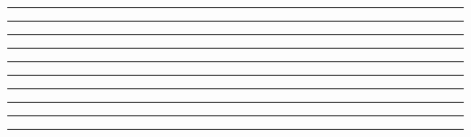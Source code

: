 \documentclass{article}
\begin{document}
\swarmwrapnext
\lipsum[1][1-5]
\lipsum[2][1-3]
\begin{swarmwrap}
  \begin{minipage}[t]{3cm}
    \centering
    \rule{\linewidth}{2cm}%
  \end{minipage}
\end{swarmwrap}
\swarmwrapnext
\lipsum[1][1-5]
\lipsum[2][1-3]
\begin{swarmwrap}
  \begin{minipage}[t]{3cm}
    \centering
    \rule{\linewidth}{2cm}%
  \end{minipage}
\end{swarmwrap}
\swarmwrapnext
\lipsum[1][1-5]
\lipsum[2][1-3]
\begin{swarmwrap}
  \begin{minipage}[t]{3cm}
    \centering
    \rule{\linewidth}{2cm}%
  \end{minipage}
\end{swarmwrap}
\swarmwrapnext
\lipsum[1][1-5]
\lipsum[2][1-3]
\begin{swarmwrap}
  \begin{minipage}[t]{3cm}
    \centering
    \rule{\linewidth}{2cm}%
  \end{minipage}
\end{swarmwrap}
\swarmwrapnext
\lipsum[1][1-5]
\lipsum[2][1-3]
\begin{swarmwrap}
  \begin{minipage}[t]{3cm}
    \centering
    \rule{\linewidth}{2cm}%
  \end{minipage}
\end{swarmwrap}
\swarmwrapnext
\lipsum[1][1-5]
\lipsum[2][1-3]
\begin{swarmwrap}
  \begin{minipage}[t]{3cm}
    \centering
    \rule{\linewidth}{2cm}%
  \end{minipage}
\end{swarmwrap}
\swarmwrapnext
\lipsum[1][1-5]
\lipsum[2][1-3]
\begin{swarmwrap}
  \begin{minipage}[t]{3cm}
    \centering
    \rule{\linewidth}{2cm}%
  \end{minipage}
\end{swarmwrap}
\swarmwrapnext
\lipsum[1][1-5]
\lipsum[2][1-3]
\begin{swarmwrap}
  \begin{minipage}[t]{3cm}
    \centering
    \rule{\linewidth}{2cm}%
  \end{minipage}
\end{swarmwrap}
\swarmwrapnext
\lipsum[1][1-5]
\lipsum[2][1-3]
\begin{swarmwrap}
  \begin{minipage}[t]{3cm}
    \centering
    \rule{\linewidth}{2cm}%
  \end{minipage}
\end{swarmwrap}
\swarmwrapnext
\lipsum[1][1-5]
\lipsum[2][1-3]
\begin{swarmwrap}
  \begin{minipage}[t]{3cm}
    \centering
    \rule{\linewidth}{2cm}%
  \end{minipage}
\end{swarmwrap}
\swarmwrapnext
\lipsum[1][1-5]
\lipsum[2][1-3]
\end{document}
